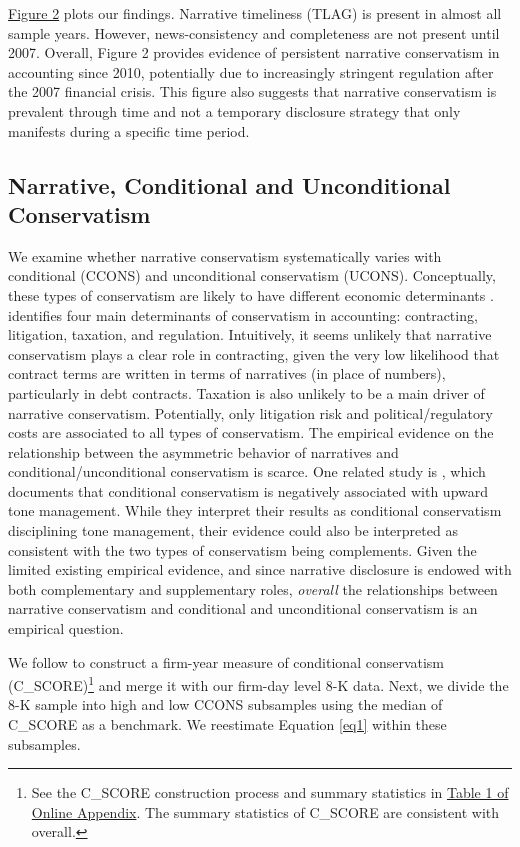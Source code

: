 \documentclass[letterpaper,12pt]{article}
\begin{document}
\begin{spacing}{1.5}
\hyperref[fig2]{Figure 2} plots our findings. Narrative timeliness (TLAG) is present in almost all sample years. However, news-consistency and completeness are not present until 2007. Overall, Figure 2 provides evidence of persistent narrative conservatism in accounting since 2010, potentially due to increasingly stringent regulation after the 2007 financial crisis. This figure also suggests that narrative conservatism is prevalent through time and not a temporary disclosure strategy that only manifests during a specific time period.

\subsection{Narrative, Conditional and Unconditional Conservatism}
\noindent We examine whether narrative conservatism systematically varies with conditional (CCONS) and unconditional conservatism (UCONS). Conceptually, these types of conservatism are likely to have different economic determinants \cite{garcialaraEconomicDeterminantsConditional2009,qiangEffectsContractingLitigation2007}.  identifies four main determinants of conservatism in accounting: contracting, litigation, taxation, and regulation. Intuitively, it seems unlikely that narrative conservatism plays a clear role in contracting, given the very low likelihood that contract terms are written in terms of narratives (in place of numbers), particularly in debt contracts. Taxation is also unlikely to be a main driver of narrative conservatism. Potentially, only litigation risk and political/regulatory costs are associated to all types of conservatism. The empirical evidence on the relationship between the asymmetric behavior of narratives and conditional/unconditional conservatism is scarce. One related study is , which documents that conditional conservatism is negatively associated with upward tone management. While they interpret their results as conditional conservatism disciplining tone management, their evidence could also be interpreted as consistent with the two types of conservatism being complements. Given the limited existing empirical evidence, and since narrative disclosure is endowed with both complementary and supplementary roles, \textit{overall} the relationships between narrative conservatism and conditional and unconditional conservatism is an empirical question. 

We follow  to construct a firm-year measure of conditional conservatism (C\_SCORE)\footnote{See the C\_SCORE construction process and summary statistics in \hyperref[OAT1]{Table 1 of Online Appendix}. The summary statistics of C\_SCORE are consistent with  overall. } and merge it with our firm-day level 8-K data. Next, we divide the 8-K sample into high and low CCONS subsamples using the median of C\_SCORE as a benchmark. We reestimate Equation \eqref{eq1} within these subsamples.


\end{spacing}
\end{document}
